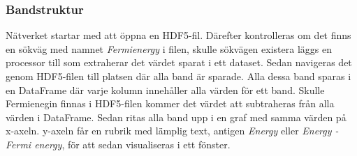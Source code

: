  




\subsubsection{Bandstruktur}
Nätverket startar med att öppna en HDF5-fil. Därefter kontrolleras om det finns en sökväg med namnet \textit{Fermienergy} i filen, skulle sökvägen existera läggs en processor till som extraherar det värdet sparat i ett dataset. Sedan navigeras det genom HDF5-filen till platsen där alla band är sparade. Alla dessa band sparas i en DataFrame där varje kolumn innehåller alla värden för ett band. Skulle Fermienegin finnas i HDF5-filen kommer det värdet att subtraheras från alla värden i DataFrame. Sedan ritas alla band upp i en graf med samma värden på x-axeln. y-axeln får en rubrik med lämplig text, antigen \textit{Energy} eller \textit{Energy - Fermi energy}, för att sedan visualiseras i ett fönster.

